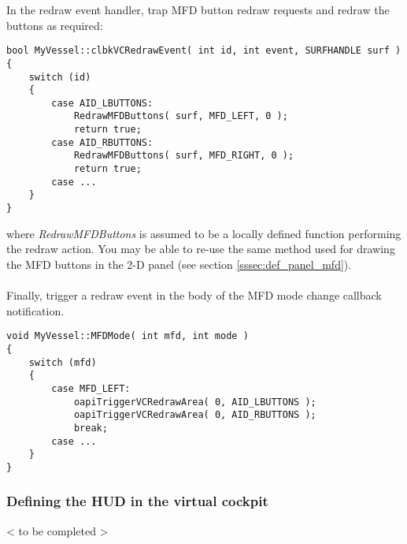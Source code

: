\documentclass[Orbiter Developer Manual.tex]{subfiles}
\begin{document}
\noindent
In the redraw event handler, trap MFD button redraw requests and redraw the buttons as required:

\begin{lstlisting}
bool MyVessel::clbkVCRedrawEvent( int id, int event, SURFHANDLE surf )
{
	switch (id)
	{
		case AID_LBUTTONS:
			RedrawMFDButtons( surf, MFD_LEFT, 0 );
			return true;
		case AID_RBUTTONS:
			RedrawMFDButtons( surf, MFD_RIGHT, 0 );
			return true;
		case ...
	}
}
\end{lstlisting}

\noindent
where \textit{RedrawMFDButtons} is assumed to be a locally defined function performing the redraw action. You may be able to re-use the same method used for drawing the MFD buttons in the 2-D panel (see section \ref{sssec:def_panel_mfd}).\\
\\
Finally, trigger a redraw event in the body of the MFD mode change callback notification.

\begin{lstlisting}
void MyVessel::MFDMode( int mfd, int mode )
{
	switch (mfd)
	{
		case MFD_LEFT:
			oapiTriggerVCRedrawArea( 0, AID_LBUTTONS );
			oapiTriggerVCRedrawArea( 0, AID_RBUTTONS );
			break;
		case ...
	}
}
\end{lstlisting}


\subsubsection{Defining the HUD in the virtual cockpit}
< to be completed >
\end{document}
